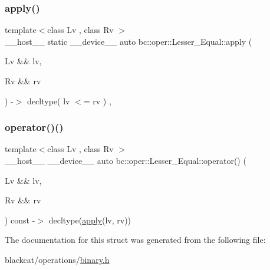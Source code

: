 \subsubsection{\texorpdfstring{apply()}{apply()}}
{\footnotesize\ttfamily template$<$class Lv , class Rv $>$ \\
\+\_\+\+\_\+host\+\_\+\+\_\+ static \+\_\+\+\_\+device\+\_\+\+\_\+ auto bc\+::oper\+::\+Lesser\+\_\+\+Equal\+::apply (\begin{DoxyParamCaption}\item[{Lv \&\&}]{lv,  }\item[{Rv \&\&}]{rv }\end{DoxyParamCaption}) -\/$>$ decltype( lv $<$= rv ) \hspace{0.3cm}{\ttfamily [inline]}, {\ttfamily [static]}}

\mbox{\label{structbc_1_1oper_1_1Lesser__Equal_a53199452a7d5481ee4d6900927204a1c}} 
\subsubsection{\texorpdfstring{operator()()}{operator()()}}
{\footnotesize\ttfamily template$<$class Lv , class Rv $>$ \\
\+\_\+\+\_\+host\+\_\+\+\_\+ \+\_\+\+\_\+device\+\_\+\+\_\+ auto bc\+::oper\+::\+Lesser\+\_\+\+Equal\+::operator() (\begin{DoxyParamCaption}\item[{Lv \&\&}]{lv,  }\item[{Rv \&\&}]{rv }\end{DoxyParamCaption}) const -\/$>$ decltype(\hyperlink{structbc_1_1oper_1_1Lesser__Equal_a2c49858872ba6a7243b0b645384c958e}{apply}(lv, rv)) \hspace{0.3cm}{\ttfamily [inline]}}



The documentation for this struct was generated from the following file\+:\begin{DoxyCompactItemize}
\item 
blackcat/operations/\hyperlink{binary_8h}{binary.\+h}\end{DoxyCompactItemize}
